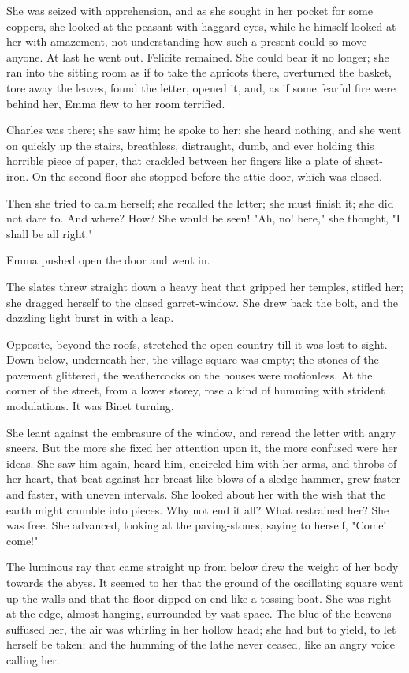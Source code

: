 \documentclass{tufte-book}
\begin{document}
She was seized with apprehension, and as she sought in her pocket for
some coppers, she looked at the peasant with haggard eyes, while he
himself looked at her with amazement, not understanding how such a
present could so move anyone. At last he went out. Felicite remained.
She could bear it no longer; she ran into the sitting room as if to take
the apricots there, overturned the basket, tore away the leaves, found
the letter, opened it, and, as if some fearful fire were behind her,
Emma flew to her room terrified.

Charles was there; she saw him; he spoke to her; she heard nothing, and
she went on quickly up the stairs, breathless, distraught, dumb, and
ever holding this horrible piece of paper, that crackled between her
fingers like a plate of sheet-iron. On the second floor she stopped
before the attic door, which was closed.

Then she tried to calm herself; she recalled the letter; she must finish
it; she did not dare to. And where? How? She would be seen! "Ah, no!
here," she thought, "I shall be all right."

Emma pushed open the door and went in.

The slates threw straight down a heavy heat that gripped her temples,
stifled her; she dragged herself to the closed garret-window. She drew
back the bolt, and the dazzling light burst in with a leap.

Opposite, beyond the roofs, stretched the open country till it was lost
to sight. Down below, underneath her, the village square was empty; the
stones of the pavement glittered, the weathercocks on the houses were
motionless. At the corner of the street, from a lower storey, rose a
kind of humming with strident modulations. It was Binet turning.

She leant against the embrasure of the window, and reread the letter
with angry sneers. But the more she fixed her attention upon it, the
more confused were her ideas. She saw him again, heard him, encircled
him with her arms, and throbs of her heart, that beat against her breast
like blows of a sledge-hammer, grew faster and faster, with uneven
intervals. She looked about her with the wish that the earth might
crumble into pieces. Why not end it all? What restrained her? She was
free. She advanced, looking at the paving-stones, saying to herself,
"Come! come!"

The luminous ray that came straight up from below drew the weight of
her body towards the abyss. It seemed to her that the ground of the
oscillating square went up the walls and that the floor dipped on
end like a tossing boat. She was right at the edge, almost hanging,
surrounded by vast space. The blue of the heavens suffused her, the air
was whirling in her hollow head; she had but to yield, to let herself
be taken; and the humming of the lathe never ceased, like an angry voice
calling her.
\end{document}
